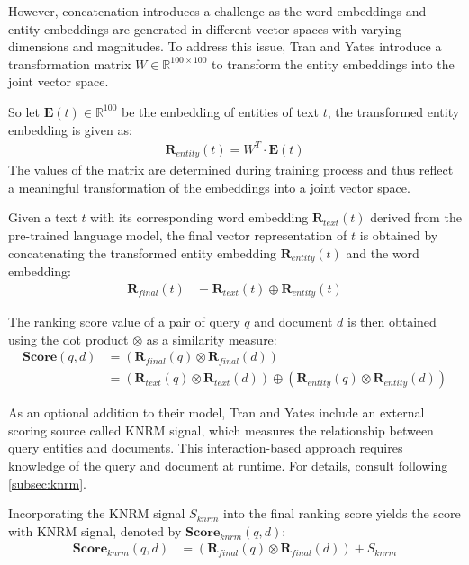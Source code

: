However, concatenation introduces a challenge as the word embeddings and entity embeddings are generated in different vector spaces with varying dimensions and magnitudes. To address this issue, Tran and Yates introduce a transformation matrix $W \in \mathbb{R}^{100 \times 100}$ to transform the entity embeddings into the joint vector space.

So let $\mathbf{E}(t) \in \mathbb{R}^{100}$ be the embedding of entities of text $t$, the transformed entity embedding is given as:
\begin{align}
    \mathbf{R}_{entity}(t) = W^T \cdot \mathbf{E}(t)
\end{align}
The values of the matrix are determined during training process and thus reflect a meaningful transformation of the embeddings into a joint vector space. 

Given a text $t$ with its corresponding word embedding $\mathbf{R}_{text}(t)$ derived from the pre-trained language model, the final vector representation of $t$ is obtained by concatenating the transformed entity embedding $\mathbf{R}_{entity}(t)$ and the word embedding:
\begin{align}
\mathbf{R}_{final}(t) &= \mathbf{R}_{text}(t) \oplus \mathbf{R}_{entity}(t)
\end{align}

The ranking score value of a pair of query $q$ and document $d$ is then obtained using the dot product $\otimes$ as a similarity measure:
\begin{align}
    \mathbf{Score}(q,d) &= \left( \mathbf{R}_{final}(q) \otimes \mathbf{R}_{final}(d) \right) \\
    &= \left( \mathbf{R}_{text}(q) \otimes \mathbf{R}_{text}(d) \right) \oplus \left( \mathbf{R}_{entity}(q) \otimes \mathbf{R}_{entity}(d) \right)
\end{align}

As an optional addition to their model, Tran and Yates include an external scoring source called KNRM signal, which measures the relationship between query entities and documents. This interaction-based approach requires knowledge of the query and document at runtime. For details, consult following \autoref{subsec:knrm}.

Incorporating the KNRM signal $S_{knrm}$ into the final ranking score yields the score with KNRM signal, denoted by $\mathbf{Score}_{knrm}(q,d)$:
\begin{align}
    \mathbf{Score}_{knrm}(q,d) &= \left( \mathbf{R}_{final}(q) \otimes \mathbf{R}_{final}(d) \right) + S_{knrm}
\end{align}

